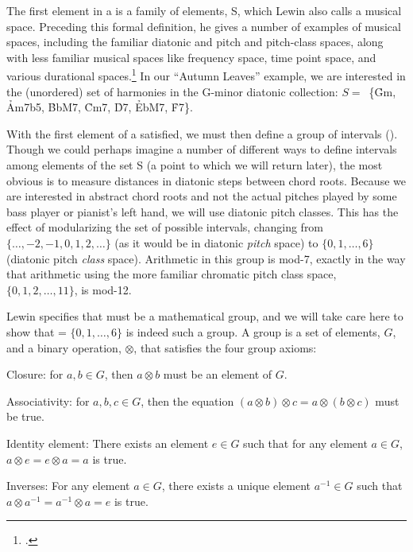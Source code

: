 The first element in a \gis{} is a family of elements, S, which Lewin also calls
a musical space. Preceding this formal definition, he gives a number of
examples of musical spaces, including the familiar diatonic and pitch and
pitch-class spaces, along with less familiar musical spaces like frequency
space, time point space, and various durational
spaces.\footcite[16--25]{lewin:gmit} In our “Autumn Leaves” example, we are
interested in the (unordered) set of harmonies in the G-minor diatonic
collection: \mbox{$S =$ \{\h{Gm},} \h{Am7b5}, \h{BbM7}, \h{Cm7}, \h{D7},
\h{EbM7}, \h{F7}\}.

With the first element of a \gis{} satisfied, we must then define a group of
intervals (\ivls). Though we could perhaps imagine a number of
different ways to define intervals among elements of the set S (a point to
which we will return later), the most obvious is to measure distances in
diatonic steps between chord roots. Because we are interested in abstract
chord roots and not the actual pitches played by some bass player or pianist’s
left hand, we will use diatonic pitch classes. This has the effect of
modularizing the set of possible intervals, changing \ivls{} from
$\{\ldots,-2,-1,0,1,2,\ldots\}$ (as it would be in diatonic \emph{pitch}
space) to $\{0,1,\ldots,6\}$ (diatonic pitch \emph{class} space).
Arithmetic in this group is mod-7, exactly in the way that arithmetic using
the more familiar chromatic pitch class space, $\{0,1,2,\ldots,11\}$, is
mod-12.

Lewin specifies that \ivls{} must be a mathematical group, and we will take care
here to show that \ivls{} = $\{0,1,\ldots,6\}$ is indeed such a group. A group
is a set of elements, $G$, and a binary operation, $\otimes$, that satisfies the
four group axioms:
\begin{compactitem}
  \singlespacing
  \item Closure: for $a, b \in  G$, then $a \otimes b$ must be an
    element of $G$.
  \item Associativity: for $a, b, c \in G$, then the equation $(a \otimes b)
    \otimes c = a \otimes (b \otimes c)$ must be true.
  \item Identity element: There exists an element $e \in G$ such that for any
    element $a \in G$, $a \otimes e = e \otimes a = a$ is true.
  \item Inverses: For any element $a \in G$, there exists a unique element
    $a^{-1} \in G$ such that $a \otimes a^{-1} = a^{-1} \otimes a = e$ is
    true.
\end{compactitem}

